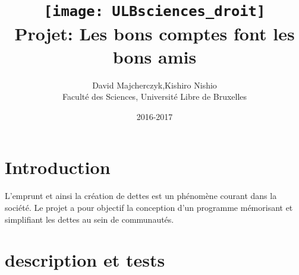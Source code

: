 \documentclass[a4paper]{article}
\begin{document}
\newcommand\tab[1][1cm]{\hspace*{#1}}
\newcommand\spc[1][0.1cm]{\hspace*{#1}}
\title{
        \texttt{[image: ULBsciences\_droit]}\\
        Projet: Les bons comptes font les bons amis \\
      }
\author{
David Majcherczyk,Kishiro Nishio\\
Facult\'e des Sciences, Universit\'e Libre de Bruxelles\\
}
\date{2016-2017}
\maketitle
\thispagestyle{empty}
\newpage
\setcounter{page}{1}
\section{Introduction}
L'emprunt et ainsi la création de dettes est un phénomène courant dans la société. Le projet a pour objectif la conception d'un programme mémorisant et simplifiant les dettes au sein de communautés.

\section{description et tests}
\end{document}
